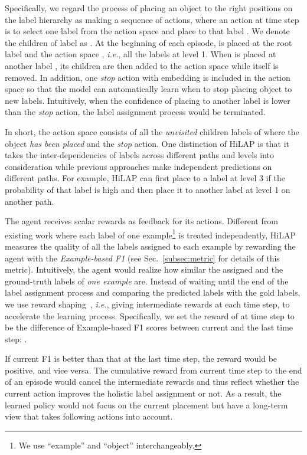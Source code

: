 \documentclass[11pt,a4paper]{article}
\newcommand{\start}[1]{\vspace{1.8mm}\noindent{{\bf #1}}}
\newcommand{\ie}{\textit{i.e.}} \newcommand{\eg}{\textit{e.g.}}
\begin{document}
\start{Actions.}
Specifically, we regard the process of placing an object  to the right positions on the label hierarchy as making a sequence of actions, where an action  at time step  is to select one label  from the action space  and place  to that label .
We denote the children of label  as .
At the beginning of each episode,  is placed at the root label  and the action space , \ie, all the labels at level 1.
When  is placed at another label , its children  are then added to the action space  while  itself is removed.
In addition, one \textit{stop} action with embedding  is included in the action space so that the model can automatically learn when to stop placing object  to new labels.
Intuitively, when the confidence of placing  to another label is lower than the \textit{stop} action, the label assignment process would be terminated.

In short, the action space  consists of all the \textit{unvisited} children labels of where the object  \textit{has been placed} and the \textit{stop} action.
One distinction of HiLAP is that it takes the inter-dependencies of labels across different paths and levels into consideration while previous approaches make independent predictions on different paths.
For example, HiLAP can first place  to a label at level 3 if the probability of that label is high and then place it to another label at level 1 on another path.


\start{Rewards.}
The agent receives scalar rewards as feedback for its actions.
Different from existing work where each label of one example\footnote{We use ``example'' and ``object'' interchangeably.} is treated independently, HiLAP measures the quality of all the labels assigned to each example  by rewarding the agent with the \textit{Example-based F1} (see Sec.~\ref{subsec:metric} for details of this metric).
Intuitively, the agent would realize how similar the assigned and the ground-truth labels of \textit{one example} are.
Instead of waiting until the end of the label assignment process and comparing the predicted labels with the gold labels, we use reward shaping~\citep{P18-1229}, \ie, giving intermediate rewards at each time step, to accelerate the learning process.
Specifically, we set the reward  of  at time step  to be the difference of Example-based F1 scores between current and the last time step: .

If current F1 is better than that at the last time step, the reward would be positive, and vice versa.
The cumulative reward from current time step to the end of an episode would cancel the intermediate rewards and thus reflect whether the current action improves the holistic label assignment or not.
As a result, the learned policy would not focus on the current placement but have a long-term view that takes following actions into account.
\end{document}
